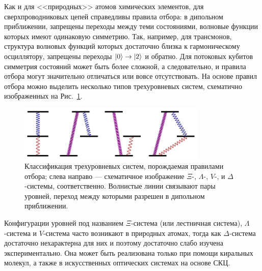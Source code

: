 Как и для <<природных>> атомов химических элементов, для сверхпроводниковых цепей справедливы правила отбора: в дипольном приближении, запрещены переходы между теми состояниями, волновые функции которых имеют одинаковую симметрию. Так, например, для трансмонов, структура волновых функций которых достаточно близка к гармоническому осциллятору, запрещены переходы $\ket{0}\rightarrow\ket{2}$ и обратно. Для потоковых кубитов симметрия состояний может быть более сложной, а следовательно, и правила отбора могут значительно отличаться или вовсе отсутствовать. На основе правил отбора можно выделить несколько типов трехуровневых систем, схематично изображенных на Рис.~\ref{fig: 3LS_class}.  
\begin{figure}[th]
	\centering
	\includegraphics[width=0.8\textwidth]{images/3Ls_V_Lbd_ladder.pdf}
	\caption[Классификация трехуровневых систем по разрешенности переходов.]{Классификация трехуровневых систем, порождаемая правилами отбора; слева направо --- схематичное изображение $\Xi$-, $\Lambda$-, $V$-, и $\Delta$-системы, соответственно. Волнистые линии связывают пары уровней, переход между которыми разрешен в дипольном приближении.}
	\label{fig: 3LS_class}
\end{figure}
Конфигурации уровней под названием $\Xi$-система (или лестничная система), $\Lambda$-система и $V$-система часто возникают в природных атомах, тогда как $\Delta$-система достаточно нехарактерна для них и поэтому достаточно слабо изучена экспериментально. Она может быть реализована только при помощи киральных молекул, а также в искусственных оптических системах на основе СКЦ. 
